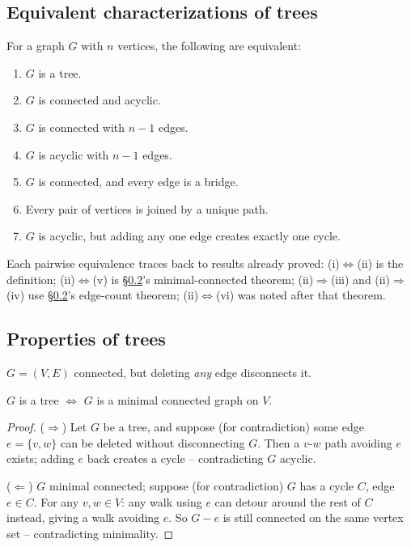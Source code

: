 \documentclass[11pt]{article}
\begin{document}
\subsection{Equivalent characterizations of trees}
\label{sec:12-1-2}

\begin{theorem}
For a graph $G$ with $n$ vertices, the following are equivalent:
\begin{enumerate}[label=(\roman*)]
    \item $G$ is a tree.
    \item $G$ is connected and acyclic.
    \item $G$ is connected with $n-1$ edges.
    \item $G$ is acyclic with $n-1$ edges.
    \item $G$ is connected, and every edge is a bridge.
    \item Every pair of vertices is joined by a unique path.
    \item $G$ is acyclic, but adding any one edge creates exactly one cycle.
\end{enumerate}
\end{theorem}
\begin{note}
Each pairwise equivalence traces back to results already proved: (i)$\Leftrightarrow$(ii) is the definition; (ii)$\Leftrightarrow$(v) is \S\ref{sec:12-2}'s minimal-connected theorem; (ii)$\Rightarrow$(iii) and (ii)$\Rightarrow$(iv) use \S\ref{sec:12-2}'s edge-count theorem; (ii)$\Leftrightarrow$(vi) was noted after that theorem.
\end{note}

\subsection{Properties of trees}
\label{sec:12-2}

\begin{definition}
$G=(V,E)$ connected, but deleting \emph{any} edge disconnects it.
\end{definition}

\begin{theorem}[CN Thm 66]
$G$ is a tree $\iff$ $G$ is a minimal connected graph on $V$.
\end{theorem}
\begin{proof}
($\Rightarrow$) Let $G$ be a tree, and suppose (for contradiction) some edge $e=\{v,w\}$ can be deleted without disconnecting $G$. Then a $v$-$w$ path avoiding $e$ exists; adding $e$ back creates a cycle -- contradicting $G$ acyclic.

($\Leftarrow$) $G$ minimal connected; suppose (for contradiction) $G$ has a cycle $C$, edge $e\in C$. For any $v,w\in V$: any walk using $e$ can detour around the rest of $C$ instead, giving a walk avoiding $e$. So $G-e$ is still connected on the same vertex set -- contradicting minimality.
\end{proof}
\end{document}
